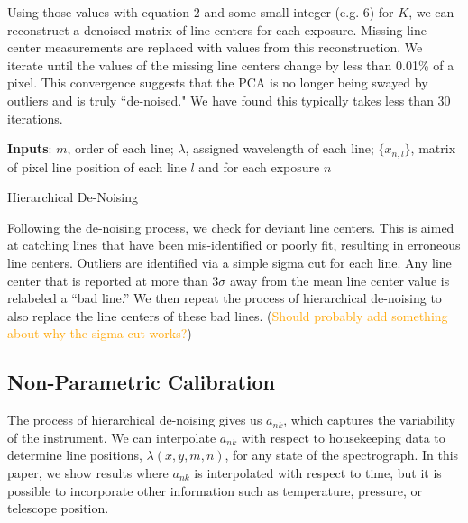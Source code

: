 \documentclass[12pt, letterpaper]{article}
\newcommand{\lz}[1]{\textcolor{orange}{#1}}
\begin{document}
Using those values with equation 2 and some small integer (e.g. 6) for $K$, we can reconstruct a denoised matrix of line centers for each exposure.  Missing line center measurements are replaced with values from this reconstruction.  We iterate until the values of the missing line centers change by less than 0.01\% of a pixel.  This convergence suggests that the PCA is no longer being swayed by outliers and is truly ``de-noised."   We have found this typically takes less than 30 iterations.

\begin{algorithm}
\SetAlgoLined
\textbf{Inputs}: $m$, order of each line; $\lambda$, assigned wavelength of each line; $\{x_{n,l}\} $, matrix of pixel line position of each line $l$ and for each exposure $n$\;
\caption{Hierarchical De-Noising}
\end{algorithm}

Following the de-noising process, we check for deviant line centers.  This is aimed at catching lines that have been mis-identified or poorly fit, resulting in erroneous line centers.  Outliers are identified via a simple sigma cut for each line.  Any line center that is reported at more than $3\sigma$ away from the mean line center value is relabeled a ``bad line.''  We then repeat the process of hierarchical de-noising to also replace the line centers of these bad lines. (\lz{Should probably add something about why the sigma cut works?})

\subsection{Non-Parametric Calibration} \label{sec:nonparam}
The process of hierarchical de-noising gives us $a_{nk}$, which captures the variability of the instrument.  We can interpolate $a_{nk}$ with respect to housekeeping data to determine line positions, $\lambda(x,y,m,n)$, for any state of the spectrograph.  In this paper, we show results where $a_{nk}$ is interpolated with respect to time, but it is possible to incorporate other information such as temperature, pressure, or telescope position.
\end{document}
